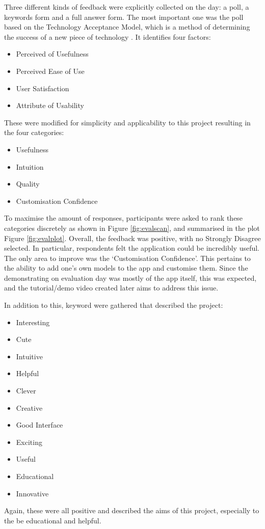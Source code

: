 \documentclass[12pt, a4paper]{article}
\begin{document}
Three different kinds of feedback were explicitly collected on the day: a poll, a keywords form and a full answer form. The most important one was the poll based on the Technology Acceptance Model, which is a method of determining the success of a new piece of technology \cite{testing:acceptancemodel}. It identifies four factors:
\begin{itemize}
    \item Perceived of Usefulness
    \item Perceived Ease of Use
    \item User Satisfaction
    \item Attribute of Usability
\end{itemize}
These were modified for simplicity and applicability to this project resulting in the four categories:
\begin{itemize}
    \item Usefulness
    \item Intuition
    \item Quality
    \item Customisation Confidence
\end{itemize}
To maximise the amount of responses, participants were asked to rank these categories discretely as shown in Figure \ref{fig:evalscan}, and summarised in the plot Figure \ref{fig:evalplot}. Overall, the feedback was positive, with no Strongly Disagree selected. In particular, respondents felt the application could be incredibly useful. The only area to improve was the `Customisation Confidence'. This pertains to the ability to add one's own models to the app and customise them. Since the demonstrating on evaluation day was mostly of the app itself, this was expected, and the tutorial/demo video created later aims to address this issue.

In addition to this, keyword were gathered that described the project:
\begin{multicols}{2}
\begin{itemize}
    \item Interesting
    \item Cute
    \item Intuitive
    \item Helpful
    \item Clever
    \item Creative
\end{itemize}
\columnbreak
\begin{itemize}
    \item Good Interface
    \item Exciting
    \item Useful
    \item Educational 
    \item Innovative
\end{itemize}
\vfill\null
\end{multicols}
Again, these were all positive and described the aims of this project, especially to the be educational and helpful.
\end{document}
